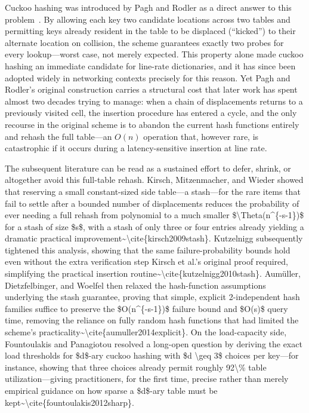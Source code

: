 \documentclass[conference]{IEEEtran}
\begin{document}
Cuckoo hashing was introduced by Pagh and Rodler as a direct answer to this problem~\cite{pagh2004cuckoo}. By allowing each key two candidate locations across two tables and permitting keys already resident in the table to be displaced (``kicked'') to their alternate location on collision, the scheme guarantees exactly two probes for every lookup---worst case, not merely expected. This property alone made cuckoo hashing an immediate candidate for line-rate dictionaries, and it has since been adopted widely in networking contexts precisely for this reason. Yet Pagh and Rodler's original construction carries a structural cost that later work has spent almost two decades trying to manage: when a chain of displacements returns to a previously visited cell, the insertion procedure has entered a cycle, and the only recourse in the original scheme is to abandon the current hash functions entirely and rehash the full table---an $O(n)$ operation that, however rare, is catastrophic if it occurs during a latency-sensitive insertion at line rate.

The subsequent literature can be read as a sustained effort to defer, shrink, or altogether avoid this full-table rehash. Kirsch, Mitzenmacher, and Wieder showed that reserving a small constant-sized side table---a stash---for the rare items that fail to settle after a bounded number of displacements reduces the probability of ever needing a full rehash from polynomial to a much smaller \$\textbackslash{}Theta(n\^{}\{-s-1\})\$ for a stash of size \$s\$, with a stash of only three or four entries already yielding a dramatic practical improvement\~{}\textbackslash{}cite\{kirsch2009stash\}. Kutzelnigg subsequently tightened this analysis, showing that the same failure-probability bounds hold even without the extra verification step Kirsch et al.'s original proof required, simplifying the practical insertion routine\~{}\textbackslash{}cite\{kutzelnigg2010stash\}. Aumüller, Dietzfelbinger, and Woelfel then relaxed the hash-function assumptions underlying the stash guarantee, proving that simple, explicit 2-independent hash families suffice to preserve the \$O(n\^{}\{-s-1\})\$ failure bound and \$O(s)\$ query time, removing the reliance on fully random hash functions that had limited the scheme's practicality\~{}\textbackslash{}cite\{aumuller2014explicit\}. On the load-capacity side, Fountoulakis and Panagiotou resolved a long-open question by deriving the exact load thresholds for \$d\$-ary cuckoo hashing with \$d \textbackslash{}geq 3\$ choices per key---for instance, showing that three choices already permit roughly 92\textbackslash{}\% table utilization---giving practitioners, for the first time, precise rather than merely empirical guidance on how sparse a \$d\$-ary table must be kept\~{}\textbackslash{}cite\{fountoulakis2012sharp\}.
\end{document}
